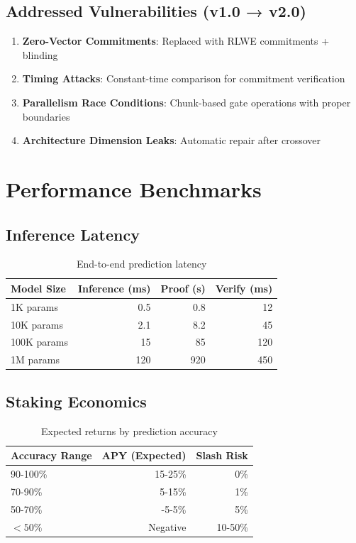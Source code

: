 \documentclass[11pt,a4paper]{article}
\begin{document}
\subsection{Addressed Vulnerabilities (v1.0 → v2.0)}

\begin{enumerate}
    \item \textbf{Zero-Vector Commitments}: Replaced with RLWE commitments + blinding
    \item \textbf{Timing Attacks}: Constant-time comparison for commitment verification
    \item \textbf{Parallelism Race Conditions}: Chunk-based gate operations with proper boundaries
    \item \textbf{Architecture Dimension Leaks}: Automatic repair after crossover
\end{enumerate}

\section{Performance Benchmarks}

\subsection{Inference Latency}

\begin{table}[h]
\centering
\begin{tabular}{lrrr}
\toprule
\textbf{Model Size} & \textbf{Inference (ms)} & \textbf{Proof (s)} & \textbf{Verify (ms)} \\
\midrule
1K params & 0.5 & 0.8 & 12 \\
10K params & 2.1 & 8.2 & 45 \\
100K params & 15 & 85 & 120 \\
1M params & 120 & 920 & 450 \\
\bottomrule
\end{tabular}
\caption{End-to-end prediction latency}
\end{table}

\subsection{Staking Economics}

\begin{table}[h]
\centering
\begin{tabular}{lrr}
\toprule
\textbf{Accuracy Range} & \textbf{APY (Expected)} & \textbf{Slash Risk} \\
\midrule
90-100\% & 15-25\% & 0\% \\
70-90\% & 5-15\% & 1\% \\
50-70\% & -5-5\% & 5\% \\
$<50\%$ & Negative & 10-50\% \\
\bottomrule
\end{tabular}
\caption{Expected returns by prediction accuracy}
\end{table}
\end{document}
